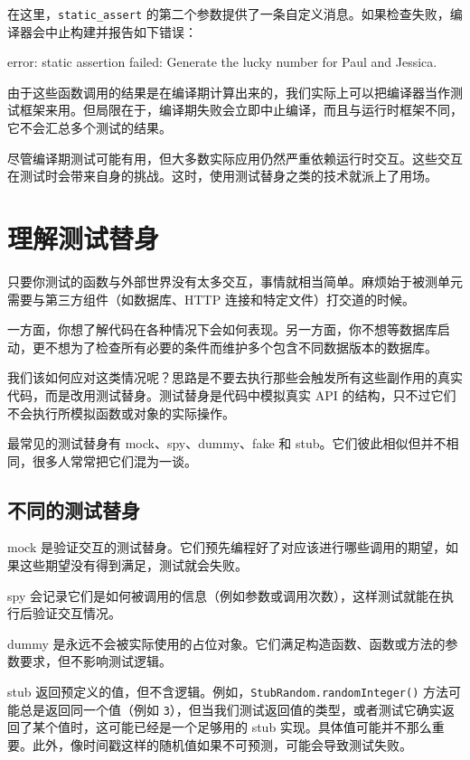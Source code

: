 在这里，\texttt{static\_\allowbreak{}assert} 的第二个参数提供了一条自定义消息。如果检查失败，编译器会中止构建并报告如下错误：

\begin{codebox}[text]
error: static assertion failed: Generate the lucky number for Paul and Jessica.
\end{codebox}

\label{idx:841}
由于这些函数调用的结果是在编译期计算出来的，我们实际上可以把编译器当作测试框架来用。但局限在于，编译期失败会立即中止编译，而且与运行时框架不同，它不会汇总多个测试的结果。

尽管编译期测试可能有用，但大多数实际应用仍然严重依赖运行时交互。这些交互在测试时会带来自身的挑战。这时，使用测试替身之类的技术就派上了用场。

\section{理解测试替身}

\label{idx:842}
只要你测试的函数与外部世界没有太多交互，事情就相当简单。麻烦始于被测单元需要与第三方组件（如数据库、HTTP 连接和特定文件）打交道的时候。

一方面，你想了解代码在各种情况下会如何表现。另一方面，你不想等数据库启动，更不想为了检查所有必要的条件而维护多个包含不同数据版本的数据库。

我们该如何应对这类情况呢？思路是不要去执行那些会触发所有这些副作用的真实代码，而是改用测试替身。测试替身是代码中模拟真实 API 的结构，只不过它们不会执行所模拟函数或对象的实际操作。

最常见的测试替身有 mock、spy、dummy、fake 和 stub。它们彼此相似但并不相同，很多人常常把它们混为一谈。

\subsection{不同的测试替身}

mock 是验证交互的测试替身。它们预先编程好了对应该进行哪些调用的期望，如果这些期望没有得到满足，测试就会失败。

spy 会记录它们是如何被调用的信息（例如参数或调用次数），这样测试就能在执行后验证交互情况。

dummy 是永远不会被实际使用的占位对象。它们满足构造函数、函数或方法的参数要求，但不影响测试逻辑。

\label{idx:843}
stub 返回预定义的值，但不含逻辑。例如，\texttt{Stub\allowbreak{}Random.\allowbreak{}random\allowbreak{}Integer(\allowbreak{})\allowbreak{}} 方法可能总是返回同一个值（例如 \texttt{3}），但当我们测试返回值的类型，或者测试它确实返回了某个值时，这可能已经是一个足够用的 stub 实现。具体值可能并不那么重要。此外，像时间戳这样的随机值如果不可预测，可能会导致测试失败。


